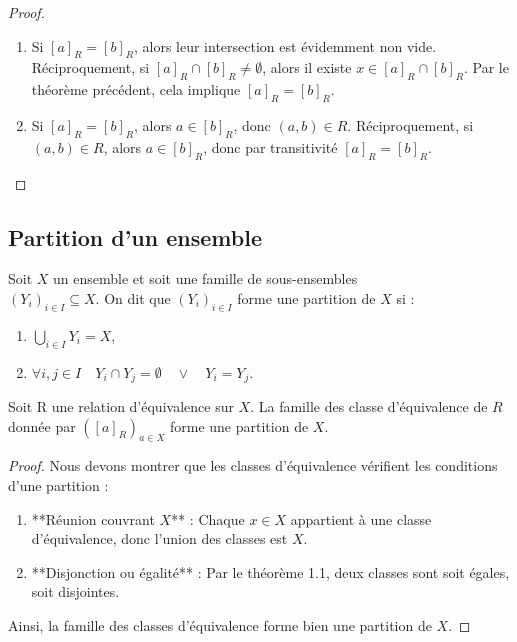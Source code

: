 \begin{proof}
    \begin{enumerate}
        \item Si $[a]_R = [b]_R$, alors leur intersection est évidemment non vide. Réciproquement, si $[a]_R \cap [b]_R \neq \emptyset$, alors il existe $x \in [a]_R \cap [b]_R$. Par le théorème précédent, cela implique $[a]_R = [b]_R$.
        \item Si $[a]_R = [b]_R$, alors $a \in [b]_R$, donc $(a, b) \in R$. Réciproquement, si $(a, b) \in R$, alors $a \in [b]_R$, donc par transitivité $[a]_R = [b]_R$.
\end{enumerate}
\end{proof}

\subsection{Partition d'un ensemble}


\begin{definition}
    Soit $X$ un ensemble et soit une famille de sous-ensembles\\ $(Y_i)_{i\in I}\subseteq X$. On dit que $(Y_i)_{i\in I}$ forme une partition de $X$ si :
    \begin{enumerate}
        \item $\bigcup_{i\in I}Y_i=X$,
        \item $\forall i,j \in I \quad Y_i\cap Y_j = \emptyset \quad  \lor \quad Y_i=Y_j $.
    \end{enumerate}
\end{definition}

\begin{lemme}
    Soit R une relation d'équivalence sur $X$. La famille des classe d'équivalence de $R$ donnée par $([a]_R)_{a\in X}$ forme une partition de $X$.
\end{lemme}


\begin{proof}
    Nous devons montrer que les classes d'équivalence vérifient les conditions d'une partition :
    \begin{enumerate}
        \item **Réunion couvrant $X$** : Chaque $x \in X$ appartient à une classe d'équivalence, donc l'union des classes est $X$.
        \item **Disjonction ou égalité** : Par le théorème 1.1, deux classes sont soit égales, soit disjointes.
    \end{enumerate}
    Ainsi, la famille des classes d'équivalence forme bien une partition de $X$.
\end{proof}


